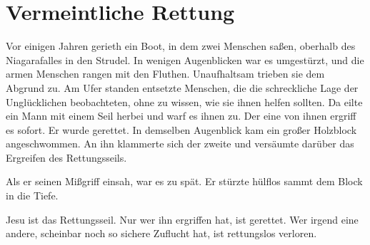 \chapter[Vermeintliche Rettung]{Vermeintliche Rettung}
Vor einigen Jahren gerieth ein Boot, in dem zwei Menschen saßen, oberhalb des Niagarafalles in den Strudel. In wenigen Augenblicken war es umgestürzt, und die armen Menschen rangen mit den Fluthen. Unaufhaltsam trieben sie dem Abgrund zu. Am Ufer standen entsetzte Menschen, die die schreckliche Lage der Unglücklichen beobachteten, ohne zu wissen, wie sie ihnen helfen sollten. Da eilte ein Mann mit einem Seil herbei und warf es ihnen zu. Der eine von ihnen ergriff es sofort. Er wurde gerettet. In demselben Augenblick kam ein großer Holzblock angeschwommen. An ihn klammerte sich der zweite und versäumte darüber das Ergreifen des Rettungsseils.

Als er seinen Mißgriff einsah, war es zu spät. Er stürzte hülflos sammt dem Block in die Tiefe.

Jesu ist das Rettungsseil. Nur wer ihn ergriffen hat, ist gerettet. Wer irgend eine andere, scheinbar noch so sichere Zuflucht hat, ist rettungslos verloren.
